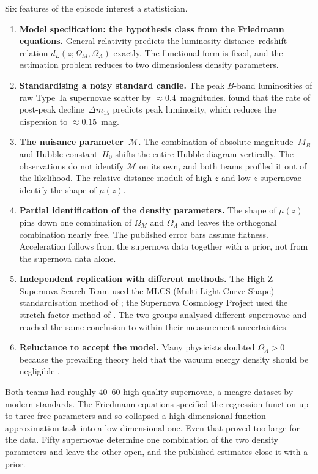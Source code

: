 \documentclass[12pt]{article}
\begin{document}
Six features of the episode interest a statistician.
\begin{enumerate}
  \item \textbf{Model specification: the hypothesis class from the
    Friedmann equations.}  General relativity predicts the
    luminosity-distance--redshift relation
    $d_L(z;\Omega_M,\Omega_\Lambda)$ exactly.  The functional form is
    fixed, and the estimation problem reduces to two dimensionless density
    parameters.
  \item \textbf{Standardising a noisy standard candle.}  The peak $B$-band
    luminosities of raw Type~Ia supernovae scatter by
    $\approx 0.4$~magnitudes.  \citet{Phillips1993} found that the rate of
    post-peak decline~$\Delta m_{15}$ predicts peak luminosity, which
    reduces the dispersion to $\approx 0.15$~mag.
  \item \textbf{The nuisance parameter~$\mathcal{M}$.}  The combination of
    absolute magnitude~$M_B$ and Hubble constant~$H_0$ shifts the entire
    Hubble diagram vertically.  The observations do not identify
    $\mathcal{M}$ on its own, and both teams profiled it out of the
    likelihood.  The relative distance moduli of high-$z$ and low-$z$
    supernovae identify the shape of $\mu(z)$.
  \item \textbf{Partial identification of the density parameters.}  The
    shape of $\mu(z)$ pins down one combination of $\Omega_M$ and
    $\Omega_\Lambda$ and leaves the orthogonal combination nearly free.  The
    published error bars assume flatness.  Acceleration follows from the
    supernova data together with a prior, not from the supernova data
    alone.
  \item \textbf{Independent replication with different methods.}
    The High-Z Supernova Search Team used the MLCS
    (Multi-Light-Curve Shape) standardisation method of
    \citet{RiessPress1996}; the Supernova Cosmology Project used the
    stretch-factor method of \citet{Perlmutter1997}.  The two groups
    analysed different supernovae and reached the same conclusion to
    within their measurement uncertainties.
  \item \textbf{Reluctance to accept the model.}  Many physicists doubted
    $\Omega_\Lambda > 0$ because the prevailing theory held that the vacuum
    energy density should be negligible \citep{Weinberg1989}.
\end{enumerate}

Both teams had roughly 40--60 high-quality supernovae, a meagre dataset by
modern standards.  The Friedmann equations specified the regression function
up to three free parameters and so collapsed a high-dimensional
function-approximation task into a low-dimensional one.  Even that proved too
large for the data.  Fifty supernovae determine one combination of the two
density parameters and leave the other open, and the published estimates close
it with a prior.
\end{document}
